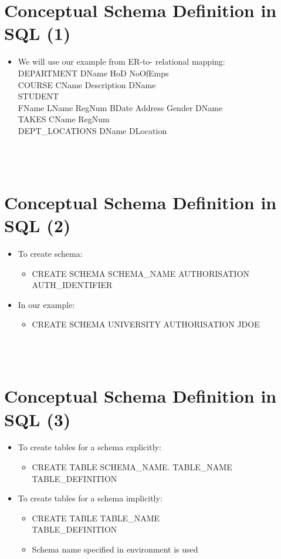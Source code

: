 \documentclass[12pt]{article}
\begin{document}
\section{Conceptual Schema Definition in SQL (1)}
\begin{itemize}
  \item We will use our example from ER-to-
relational mapping:\\
DEPARTMENT DName HoD NoOfEmps\\
COURSE CName Description DName\\
STUDENT\\
FName LName RegNum BDate Address Gender DName\\
TAKES CName RegNum\\
DEPT\_LOCATIONS DName DLocation\\
\end{itemize}
\\ 
 \\
\section{Conceptual Schema Definition in SQL (2)}
\begin{itemize}
  \item To create schema:
\begin{itemize}
  \item CREATE SCHEMA \<SCHEMA\_NAME\>
AUTHORISATION \<AUTH\_IDENTIFIER\>
\end{itemize}
  \item In our example:
\begin{itemize}
  \item CREATE SCHEMA UNIVERSITY
AUTHORISATION JDOE\\
\end{itemize}
\end{itemize}
\\ 
 \\
\section{Conceptual Schema Definition in SQL (3)}
\begin{itemize}
  \item To create tables for a schema explicitly:
\begin{itemize}
  \item CREATE TABLE
\<SCHEMA\_NAME\>. \<TABLE\_NAME\> \\
\<TABLE\_DEFINITION\>\\
\end{itemize}
  \item To create tables for a schema implicitly:
\begin{itemize}
  \item CREATE TABLE
\<TABLE\_NAME\>\\
\<TABLE\_DEFINITION\>\\
  \item Schema name specified in environment is used
\end{itemize}
\end{itemize}
\\ 
 \\
\end{document}
